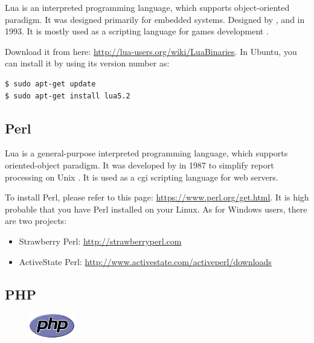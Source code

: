 \documentclass{KodeBook}
\begin{document}
Lua is an interpreted programming language, which supports object-oriented paradigm.
It was designed primarily for embedded systems.
Designed by ,  and  in 1993.
It is mostly used as a scripting language for games development \citep{2018-lua}.

Download it from here: \url{http://lua-users.org/wiki/LuaBinaries}. 
In Ubuntu, you can install it by using its version number as:
\begin{lstlisting}[style=shellStyle]
$ sudo apt-get update
$ sudo apt-get install lua5.2
\end{lstlisting}


\subsection{Perl}


Lua is a general-purpose interpreted programming language, which supports oriented-object paradigm. 
It was developed by  in 1987 to simplify report processing on Unix \citep{2001-ashton}.
It is used as a \ac{cgi} scripting language for web servers.

To install Perl, please refer to this page: \url{https://www.perl.org/get.html}. 
It is high probable that you have Perl installed on your Linux. 
As for Windows users, there are two projects: 
\begin{itemize}
	\item Strawberry Perl: \url{http://strawberryperl.com}
	\item ActiveState Perl: \url{http://www.activestate.com/activeperl/downloads}
\end{itemize}

\subsection{PHP}

\begin{figure}
	\centering
	\vspace{-20pt}
	\includegraphics[width=2cm]{../img/PHP.pdf}
	\vspace{-10pt}
\end{figure}
\end{document}
